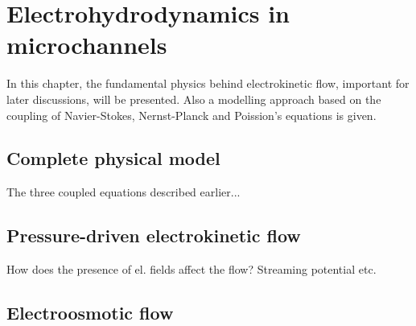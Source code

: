 \chapter{Electrohydrodynamics in microchannels}

In this chapter, the fundamental physics behind electrokinetic flow,
important for later discussions, will be presented. Also a modelling
approach based on the coupling of Navier-Stokes, Nernst-Planck and
Poission's equations is given.










\section{Complete physical model}
The three coupled equations described earlier...

\section{Pressure-driven electrokinetic flow}
How does the presence of el. fields affect the flow?
Streaming potential etc.

\section{Electroosmotic flow}




